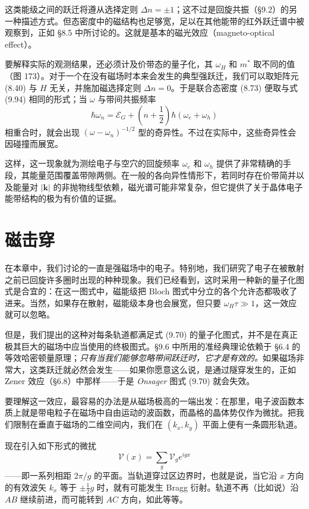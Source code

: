 这类能级之间的跃迁将遵从选择定则 $\Delta n=\pm 1$；这不过是回旋共振（§9.2）的另一种描述方式。但态密度中的磁结构也足够宽，足以在其他能带的红外跃迁谱中被观察到，正如 §8.5 中所讨论的。这就是基本的磁光效应（magneto-optical effect）。

要解释实际的观测结果，还必须计及价带态的量子化，其 $\omega_{H}$ 和 $m^{*}$ 取不同的值（图 173）。对于一个在没有磁场时本来会发生的典型强跃迁，我们可以取矩阵元 (8.40) 与 $H$ 无关，并施加磁选择定则 $\Delta n=0$。于是联合态密度 (8.73) 便取与式 (9.94) 相同的形式；当 $\omega$ 与带间共振频率
\begin{equation*}
\hbar\omega_{n}=\mathcal{E}_{G}+\left(n+\frac{1}{2}\right)\hbar\left(\omega_{e}+\omega_{h}\right)
\tag{9.95}
\end{equation*}
相重合时，就会出现 $(\omega-\omega_{n})^{-1/2}$ 型的奇异性。不过在实际中，这些奇异性会因碰撞而展宽。

这样，这一现象就为测绘电子与空穴的回旋频率 $\omega_{e}$ 和 $\omega_{h}$ 提供了非常精确的手段，其能量范围覆盖带隙两侧。在一般的各向异性情形下，若同时存在价带简并以及能量对 $|\mathbf{k}|$ 的非抛物线型依赖，磁光谱可能非常复杂，但它提供了关于晶体电子能带结构的极为有价值的证据。

\section{磁击穿}

在本章中，我们讨论的一直是强磁场中的电子。特别地，我们研究了电子在被散射之前已回旋许多圈时出现的种种现象。我们已经看到，这时采用一种新的量子化图式是合宜的：在这一图式中，磁能级把 Bloch 图式中分立的各个允许态都吸收了进来。当然，如果存在散射，磁能级本身也会展宽，但只要 $\omega_{H}\tau\gg 1$，这一效应就可以忽略。

但是，我们提出的这种对每条轨道都满足式 (9.70) 的量子化图式，并不是在真正极其巨大的磁场中应当使用的终极图式。§9.6 中所用的准经典理论依赖于 §6.4 的等效哈密顿量原理；\emph{只有当我们能够忽略带间跃迁时，它才是有效的。}如果磁场非常大，这类跃迁就必然会发生——如果你愿意这么说，是通过隧穿发生的，正如 Zener 效应（§6.8）中那样——于是 \emph{Onsager} 图式 (9.70) 就会失效。

要理解这一效应，最容易的办法是从磁场极高的一端出发：在那里，电子波函数本质上就是带电粒子在磁场中自由运动的波函数，而晶格的晶体势仅作为微扰。把我们限制在垂直于磁场的二维空间内，我们在 $(k_{x},k_{y})$ 平面上便有一条圆形轨道。

现在引入如下形式的微扰
\begin{equation*}
\mathcal{V}(x)=\sum_{g}\mathcal{V}_{g}e^{igx}
\tag{9.96}
\end{equation*}
——即一系列相距 $2\pi/g$ 的平面。当轨道穿过区边界时，也就是说，当它沿 $x$ 方向的有效波矢 $k_{x}$ 等于 $\pm\frac{1}{2}g$ 时，就有可能发生 Bragg 衍射。轨道不再（比如说）沿 $AB$ 继续前进，而可能转到 $AC$ 方向，如此等等。

